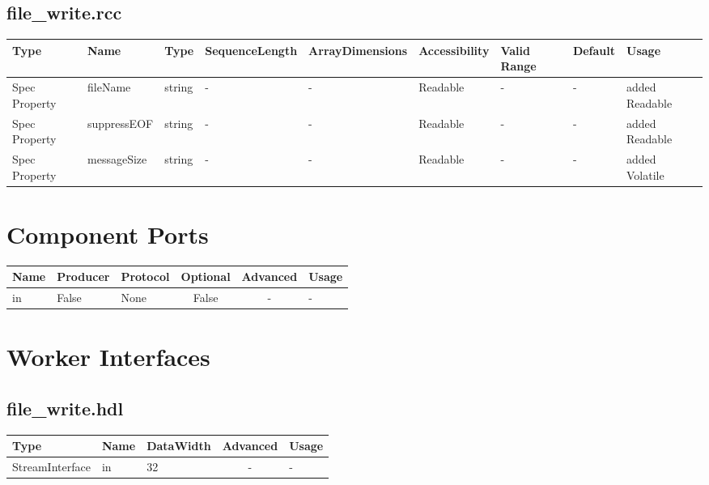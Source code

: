 \documentclass{article}
\def\comp{file\_write}
\begin{document}
\begin{landscape}
	\subsection*{\comp.rcc}
	\begin{scriptsize}
    \begin{tabular}{|p{2cm}|p{2.75cm}|p{3.5cm}|p{2cm}|p{2cm}|p{2.25cm}|p{1.5cm}|p{1cm}|p{4cm}|}
			\hline
			\rowcolor{blue}
			Type     & Name                      & Type  & SequenceLength & ArrayDimensions & Accessibility       & Valid Range & Default & Usage                                      \\
			\hline
			Spec Property & fileName & string  & - & - & Readable & -  &- & added Readable \\
			\hline
			Spec Property & suppressEOF & string  & - & - & Readable & -  &- & added Readable \\
			\hline
			Spec Property & messageSize & string  & - & - & Readable & -  &- & added Volatile \\
			\hline

    \end{tabular}
	\end{scriptsize}

	\section*{Component Ports}
	\begin{scriptsize}
\begin{tabular}{|M{2cm}|M{1.5cm}|M{4cm}|c|c|M{9cm}|}
\hline
{}
Name & Producer & Protocol & Optional & Advanced & Usage
\\
\hline
in & False & None& False & - & -\\
\hline
\end{tabular}
	\end{scriptsize}

	\section*{Worker Interfaces}
	\subsection*{\comp.hdl}
	\begin{scriptsize}
\begin{tabular}{|M{2cm}|M{1.5cm}|M{4cm}|c|M{12cm}|}
\hline
{}
Type & Name & DataWidth & Advanced & Usage
\\
\hline
StreamInterface & in & 32 & - & -\\
\hline
\end{tabular}
	\end{scriptsize}


\end{landscape}
\end{document}
